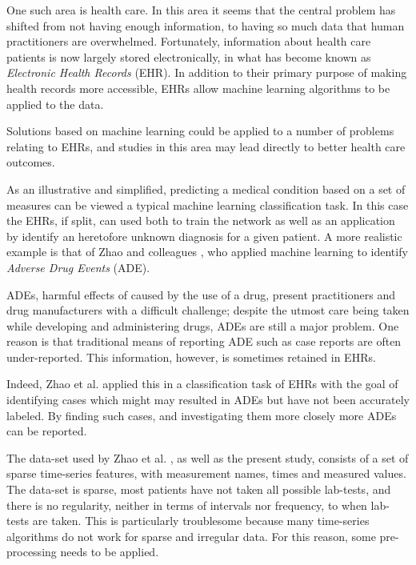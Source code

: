 \documentclass[conference]{IEEEtran}
\begin{document}
One such area is health care. In this area it seems that the central problem has shifted from not having enough information, to having so much data that human practitioners are overwhelmed. Fortunately, information about health care patients is now largely stored electronically, in what has become known as \emph{Electronic Health Records} (EHR). In addition to their primary purpose of making health records more accessible, EHRs allow machine learning algorithms to be applied to the data.

Solutions based on machine learning could be applied to a number of problems relating to EHRs, and studies in this area may lead directly to better health care outcomes.

As an illustrative and simplified, predicting a medical condition based on a set of measures can be viewed a typical machine learning classification task. In this case the EHRs, if split, can used both to train the network as well as an application by identify an heretofore unknown diagnosis for a given patient. A more realistic example is that of Zhao and colleagues \cite{zhao2014}, who applied machine learning to identify \emph{Adverse Drug Events} (ADE).

ADEs, harmful effects of caused by the use of a drug, present practitioners and drug manufacturers with a difficult challenge; despite the utmost care being taken while developing and administering drugs, ADEs are still a major problem. One reason is that traditional means of reporting ADE such as case reports are often under-reported. This information, however, is sometimes retained in EHRs. \cite{zhao2014}

Indeed, Zhao et al. \cite{zhao2014} applied this in a classification task of EHRs with the goal of identifying cases which might may resulted in ADEs but have not been accurately labeled. By finding such cases, and investigating them more closely more ADEs can be reported.

The data-set used by Zhao et al. \cite{zhao2014}, as well as the present study, consists of a set of sparse time-series features, with measurement names, times and measured values. The data-set is sparse, most patients have not taken all possible lab-tests, and there is no regularity, neither in terms of intervals nor frequency, to when lab-tests are taken. This is particularly troublesome because many time-series algorithms do not work for sparse and irregular data. For this reason, some pre-processing needs to be applied.
\end{document}
